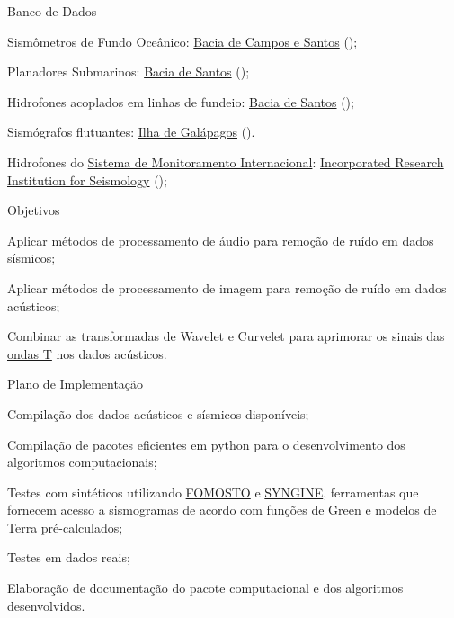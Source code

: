 \documentclass[10pt,a4paper,oneside]{book}
\begin{document}
\begin{fancyenum}{\faDatabase}{Banco de Dados}
	\item Sismômetros de Fundo Oceânico: \href{https://sismo-oceano.ufsc.br/}{Bacia de Campos e Santos} (\faLock);
	\item Planadores Submarinos: \href{https://comunicabaciadesantos.petrobras.com.br/projeto-de-monitoramento-da-paisagem-acustica-submarina-pmpas-}{Bacia de Santos} (\faLock);
	\item Hidrofones acoplados em linhas de fundeio: \href{https://comunicabaciadesantos.petrobras.com.br/projeto-de-monitoramento-da-paisagem-acustica-submarina-pmpas-}{Bacia de Santos} (\faLock);
	\item Sismógrafos flutuantes: \href{https://www.geoazur.fr/GLOBALSEIS/Data.html}{Ilha de Galápagos} (\faUnlock).
	\item Hidrofones do \href{https://www.ctbto.org/our-work/international-monitoring-system}{Sistema de Monitoramento Internacional}: \href{https://ds.iris.edu/gmap/\#network=IM\&planet=earth}{Incorporated Research Institution for Seismology} (\faUnlock);

\end{fancyenum}

\begin{fancyenum}{\faFutbol}{Objetivos}
	\item Aplicar métodos de processamento de áudio para remoção de ruído em dados sísmicos;
	\item Aplicar métodos de processamento de imagem para remoção de ruído em dados acústicos;
	\item Combinar as transformadas de Wavelet e Curvelet para aprimorar os sinais das \href{https://insu.hal.science/insu-00915042/document}{ondas T} nos dados acústicos.
\end{fancyenum}

\begin{fancyenum}{\faBrain}{Plano de Implementação}
	\item Compilação dos dados acústicos e sísmicos disponíveis;
	\item Compilação de pacotes eficientes em python para o desenvolvimento dos algoritmos computacionais;
	\item Testes com sintéticos utilizando \href{https://pyrocko.org/docs/current/apps/fomosto/tutorial.html}{FOMOSTO} e \href{https://ds.iris.edu/ds/products/syngine/}{SYNGINE}, ferramentas que fornecem acesso a sismogramas de acordo com funções de Green e modelos de Terra pré-calculados;
	\item Testes em dados reais;
	\item Elaboração de documentação do pacote computacional e dos algoritmos desenvolvidos.
\end{fancyenum}
\end{document}
